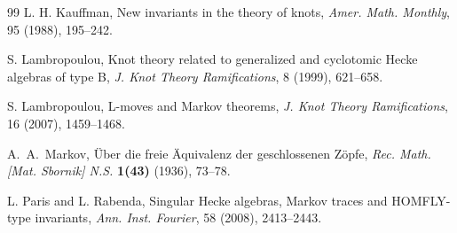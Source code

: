 \documentclass[11pt]{article}
\numberwithin{equation}{section}
\theoremstyle{definition}
\begin{document}
\begin{thebibliography}{99}
L. H. Kauffman,
\newblock New invariants in the theory of knots,
\newblock \emph{Amer. Math. Monthly}, 95 (1988), 195--242.

S. Lambropoulou,
\newblock Knot theory related to generalized and cyclotomic Hecke algebras of type B,
\newblock \emph{J. Knot Theory Ramifications}, 8 (1999), 621--658.

S. Lambropoulou,
\newblock L-moves and Markov theorems,
\newblock \emph{J. Knot Theory Ramifications}, 16 (2007), 1459--1468.

A.~A.~Markov,
\newblock Über die freie Äquivalenz der geschlossenen Zöpfe,
\newblock \emph{Rec. Math. [Mat. Sbornik] N.S.} \textbf{1(43)} (1936), 73--78.

L. Paris and L. Rabenda,
\newblock Singular Hecke algebras, Markov traces and HOMFLY-type invariants,
\newblock \emph{Ann. Inst. Fourier}, 58 (2008), 2413--2443.

\end{thebibliography}
\end{document}
